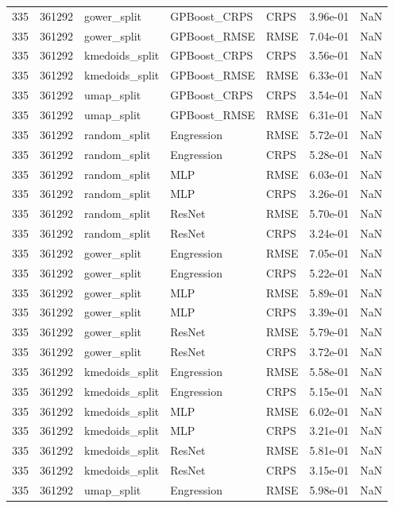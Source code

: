 \begin{tabular}{rrlllrr}
335 & 361292 & gower\_split & GPBoost\_CRPS & CRPS & 3.96e-01 & NaN \\
335 & 361292 & gower\_split & GPBoost\_RMSE & RMSE & 7.04e-01 & NaN \\
335 & 361292 & kmedoids\_split & GPBoost\_CRPS & CRPS & 3.56e-01 & NaN \\
335 & 361292 & kmedoids\_split & GPBoost\_RMSE & RMSE & 6.33e-01 & NaN \\
335 & 361292 & umap\_split & GPBoost\_CRPS & CRPS & 3.54e-01 & NaN \\
335 & 361292 & umap\_split & GPBoost\_RMSE & RMSE & 6.31e-01 & NaN \\
335 & 361292 & random\_split & Engression & RMSE & 5.72e-01 & NaN \\
335 & 361292 & random\_split & Engression & CRPS & 5.28e-01 & NaN \\
335 & 361292 & random\_split & MLP & RMSE & 6.03e-01 & NaN \\
335 & 361292 & random\_split & MLP & CRPS & 3.26e-01 & NaN \\
335 & 361292 & random\_split & ResNet & RMSE & 5.70e-01 & NaN \\
335 & 361292 & random\_split & ResNet & CRPS & 3.24e-01 & NaN \\
335 & 361292 & gower\_split & Engression & RMSE & 7.05e-01 & NaN \\
335 & 361292 & gower\_split & Engression & CRPS & 5.22e-01 & NaN \\
335 & 361292 & gower\_split & MLP & RMSE & 5.89e-01 & NaN \\
335 & 361292 & gower\_split & MLP & CRPS & 3.39e-01 & NaN \\
335 & 361292 & gower\_split & ResNet & RMSE & 5.79e-01 & NaN \\
335 & 361292 & gower\_split & ResNet & CRPS & 3.72e-01 & NaN \\
335 & 361292 & kmedoids\_split & Engression & RMSE & 5.58e-01 & NaN \\
335 & 361292 & kmedoids\_split & Engression & CRPS & 5.15e-01 & NaN \\
335 & 361292 & kmedoids\_split & MLP & RMSE & 6.02e-01 & NaN \\
335 & 361292 & kmedoids\_split & MLP & CRPS & 3.21e-01 & NaN \\
335 & 361292 & kmedoids\_split & ResNet & RMSE & 5.81e-01 & NaN \\
335 & 361292 & kmedoids\_split & ResNet & CRPS & 3.15e-01 & NaN \\
335 & 361292 & umap\_split & Engression & RMSE & 5.98e-01 & NaN \\

\end{tabular}
